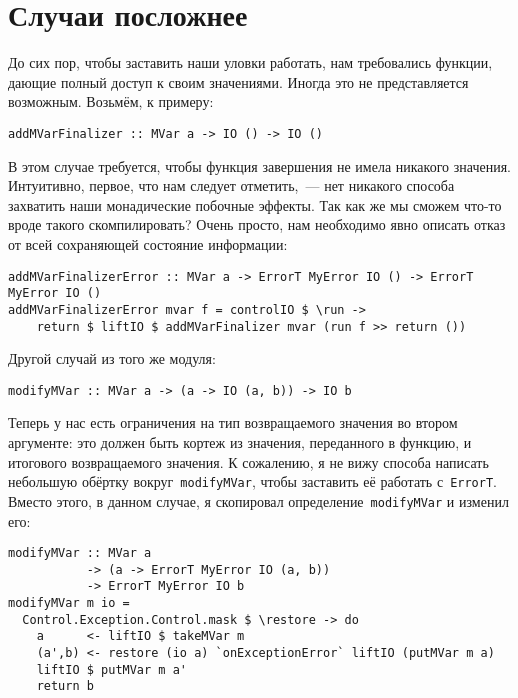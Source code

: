 \section{Случаи посложнее}
До сих пор, чтобы заставить наши уловки работать, нам требовались функции,
дающие полный доступ к своим значениями. Иногда это не представляется
возможным.  Возьмём, к примеру:

\begin{lstlisting}
addMVarFinalizer :: MVar a -> IO () -> IO ()
\end{lstlisting}

В этом случае требуется, чтобы функция завершения не имела никакого значения.
Интуитивно, первое, что нам следует отметить,~--- нет никакого способа
захватить наши монадические побочные эффекты. Так как же мы сможем что-то вроде
такого скомпилировать? Очень просто, нам необходимо явно описать отказ от всей
сохраняющей состояние информации:

\begin{lstlisting}
addMVarFinalizerError :: MVar a -> ErrorT MyError IO () -> ErrorT MyError IO ()
addMVarFinalizerError mvar f = controlIO $ \run ->
    return $ liftIO $ addMVarFinalizer mvar (run f >> return ())
\end{lstlisting}

Другой случай из того же модуля:

\begin{lstlisting}
modifyMVar :: MVar a -> (a -> IO (a, b)) -> IO b
\end{lstlisting}

Теперь у нас есть ограничения на тип возвращаемого значения во втором
аргументе: это должен быть кортеж из значения, переданного в функцию, и
итогового возвращаемого значения. К сожалению, я не вижу способа написать
небольшую обёртку вокруг~\lstinline'modifyMVar', чтобы заставить её работать
с~\lstinline'ErrorT'.  Вместо этого, в данном случае, я скопировал
определение~\lstinline'modifyMVar' и изменил его:

\begin{lstlisting}
modifyMVar :: MVar a
           -> (a -> ErrorT MyError IO (a, b))
           -> ErrorT MyError IO b
modifyMVar m io =
  Control.Exception.Control.mask $ \restore -> do
    a      <- liftIO $ takeMVar m
    (a',b) <- restore (io a) `onExceptionError` liftIO (putMVar m a)
    liftIO $ putMVar m a'
    return b
\end{lstlisting}

